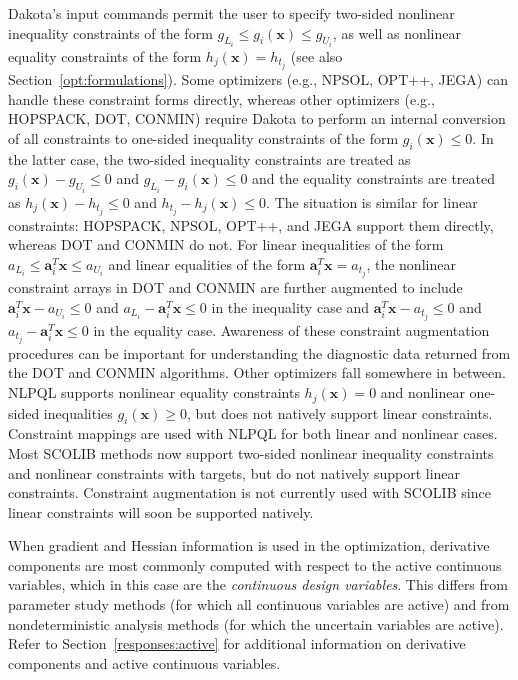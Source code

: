 Dakota's input commands permit the user to specify two-sided nonlinear
inequality constraints of the form $g_{L_{i}} \leq g_{i}(\mathbf{x})
\leq g_{U_{i}}$, as well as nonlinear equality constraints of the form
$h_{j}(\mathbf{x}) = h_{t_{j}}$ (see also
Section~\ref{opt:formulations}). Some optimizers
(e.g., NPSOL, OPT++, JEGA) can handle these constraint forms directly,
whereas other optimizers (e.g., HOPSPACK, DOT, CONMIN) require Dakota
to perform an internal conversion of all constraints to one-sided
inequality constraints of the form $g_{i}(\mathbf{x}) \leq 0$. In the
latter case, the two-sided inequality constraints are treated as
$g_{i}(\mathbf{x}) - g_{U_{i}} \leq 0$ and $g_{L_{i}} -
g_{i}(\mathbf{x}) \leq 0$ and the equality constraints are treated as
$h_{j}(\mathbf{x}) - h_{t_{j}} \leq 0$ and $h_{t_{j}} -
h_{j}(\mathbf{x}) \leq 0$. The situation is similar for linear
constraints: HOPSPACK, NPSOL, OPT++, and JEGA support them directly,
whereas DOT and CONMIN do not. For linear inequalities of the form
$a_{L_{i}} \leq \mathbf{a}_{i}^{T}\mathbf{x} \leq a_{U_{i}}$ and
linear equalities of the form $\mathbf{a}_{i}^{T}\mathbf{x} =
a_{t_{j}}$, the nonlinear constraint arrays in DOT and CONMIN are
further augmented to include $\mathbf{a}_{i}^{T}\mathbf{x} - a_{U_{i}}
\leq 0$ and $a_{L_{i}} - \mathbf{a}_{i}^{T}\mathbf{x} \leq 0$ in the
inequality case and $\mathbf{a}_{i}^{T}\mathbf{x} - a_{t_{j}} \leq 0$
and $a_{t_{j}} - \mathbf{a}_{i}^{T}\mathbf{x} \leq 0$ in the equality
case. Awareness of these constraint augmentation procedures can be
important for understanding the diagnostic data returned from the DOT
and CONMIN algorithms. Other optimizers fall somewhere in between.
NLPQL supports nonlinear equality constraints $h_{j}(\mathbf{x}) = 0$
and nonlinear one-sided inequalities $g_{i}(\mathbf{x}) \geq 0$, but
does not natively support linear constraints. Constraint mappings are
used with NLPQL for both linear and nonlinear cases. Most SCOLIB
methods now support two-sided nonlinear inequality constraints and
nonlinear constraints with targets, but do not natively support linear
constraints. Constraint augmentation is not currently used with
SCOLIB since linear constraints will soon be supported natively.

When gradient and Hessian information is used in the optimization,
derivative components are most commonly computed with respect to the
active continuous variables, which in this case are the
\emph{continuous design variables}. This differs from parameter study
methods (for which all continuous variables are active) and from
nondeterministic analysis methods (for which the uncertain variables
are active). Refer to Section~\ref{responses:active} for additional
information on derivative components and active continuous variables.

